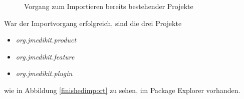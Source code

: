 \begin{figure}[H]
\centering
{}
\caption{Vorgang zum Importieren bereits bestehender Projekte}
\label{import}
\end{figure}

War der Importvorgang erfolgreich, sind die drei Projekte 

\begin{itemize}
\item \textit{org.jmedikit.product}
\item \textit{org.jmedikit.feature}
\item  \textit{org.jmedikit.plugin} 
\end{itemize}

wie in Abbildung \ref{finishedimport} zu sehen, im Package Explorer vorhanden.

